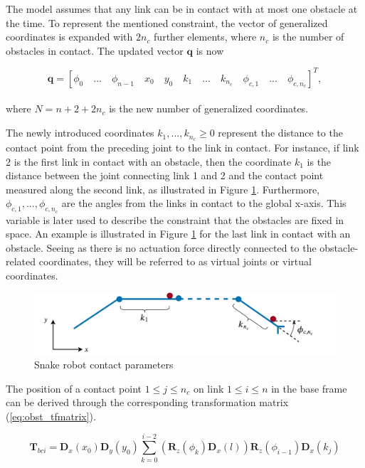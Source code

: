 The model assumes that any link can be in contact with at most one obstacle at the time. To represent the mentioned constraint, the vector of generalized coordinates is expanded with $2n_c$ further elements, where $n_c$ is the number of obstacles in contact. The updated vector $\mathbf{q}$ is now

\begin{equation} \label{eq:q2}
    \mathbf{q} = 
    [
        \phi_0 \quad... \quad \phi_{n-1} \quad x_0 \quad y_0 \quad k_{1} \quad ... \quad k_{n_c} \quad \phi_{c,1} \quad ... \quad \phi_{c,n_c}
    ]^T,
\end{equation}
\\
where $N = n + 2 + 2n_c$ is the new number of generalized coordinates.

The newly introduced coordinates $k_{1}, ... , k_{n_c} \geq 0$ represent the distance to the contact point from the preceding joint to the link in contact. For instance, if link 2 is the first link in contact with an obstacle, then the coordinate $k_{1}$ is the distance between the joint connecting link 1 and 2 and the contact point measured along the second link, as illustrated in Figure \ref{fig:obst-coords}. Furthermore, $\phi_{c,1}, ... , \phi_{c,n_c}$ are the angles from the links in contact to the global x-axis. This variable is later used to describe the constraint that the obstacles are fixed in space. An example is illustrated in Figure \ref{fig:obst-coords} for the last link in contact with an obstacle.
Seeing as there is no actuation force directly connected to the obstacle-related coordinates, they will be referred to as virtual joints or virtual coordinates.

\begin{figure}
    \centering
    \includegraphics[width=\textwidth]{figures/theory/obst-coords.pdf}
    \caption{Snake robot contact parameters}
    \label{fig:obst-coords}
\end{figure}

The position of a contact point $1\leq j\leq n_c$ on link $1\leq i\leq n$ in the base frame can be derived through the corresponding transformation matrix (\ref{eq:obst_tfmatrix}).

\begin{equation} \label{eq:obst_tfmatrix}
    \textbf{T}_{b ci} = \textbf{D}_x(x_0) \textbf{D}_y(y_0) \sum_{k=0}^{i-2} (\textbf{R}_z(\phi_k) \textbf{D}_x(l)) \textbf{R}_z(\phi_{i-1}) \textbf{D}_x(k_{j})
\end{equation}


